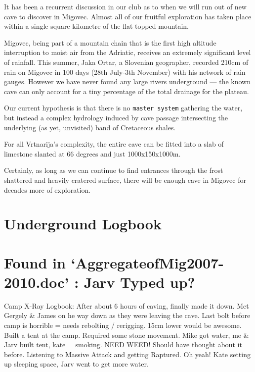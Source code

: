 It has been a recurrent discussion in our club as to when we will run
out of new cave to discover in Migovec. Almost all of our fruitful
exploration has taken place within a single square kilometre of the flat
topped mountain.

Migovec, being part of a mountain chain that is the first high altitude
interruption to moist air from the Adriatic, receives an extremely
significant level of rainfall. This summer, Jaka Ortar, a Slovenian
geographer, recorded 210cm of rain on Migovec in 100 days (28th July-3th
November) with his network of rain gauges. However we have never found
any large rivers underground --- the known cave can only account for a
tiny percentage of the total drainage for the plateau.

Our current hypothesis is that there is no \texttt{master\ system}
gathering the water, but instead a complex hydrology induced by cave
passage intersecting the underlying (as yet, unvisited) band of
Cretaceous shales.

For all Vrtnarija's complexity, the entire cave can be fitted into a
slab of limestone slanted at 66 degrees and just 1000x150x1000m.

Certainly, as long as we can continue to find entrances through the
frost shattered and heavily cratered surface, there will be enough cave
in Migovec for decades more of exploration.

\section{Underground Logbook}\label{underground-logbook}

\section{\texorpdfstring{Found in `AggregateofMig2007-2010.doc' : Jarv
Typed
up?}{Found in AggregateofMig2007-2010.doc : Jarv Typed up?}}\label{found-in-aggregateofmig2007-2010.doc-jarv-typed-up}

Camp X-Ray Logbook: After about 6 hours of caving, finally made it down.
Met Gergely \& James on he way down as they were leaving the cave. Last
bolt before camp is horrible = needs rebolting / rerigging. 15cm lower
would be awesome. Built a tent at the camp. Required some stone
movement. Mike got water, me \& Jarv built tent, kate = smoking. NEED
WEED! Should have thought about it before. Listening to Massive Attack
and getting Raptured. Oh yeah! Kate setting up sleeping space, Jarv went
to get more water.

